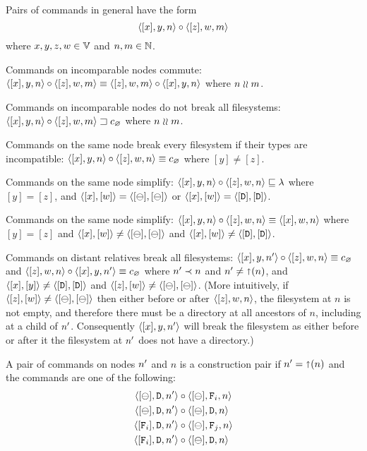 
\bigskip

\noindent
Pairs of commands in general have the form
\[ \cxynv\cc  \czwmv \]
where $x,y,z,w\in\setv$ and $n,m\in\setn$. 

\begin{myax}
Commands on incomparable nodes commute:
$\cxynv\cc\czwmv \equiv \czwmv\cc\cxynv$ where $n\unrel m$.
\end{myax}

\begin{myax}
Commands on incomparable nodes do not break all filesystems:
$\wrksx{\cxynv\cc\czwmv}$ where $n\unrel m$.
\end{myax}

\begin{myax}
Commands on the same node break every filesystem if their types are incompatible:
$\cxynv\cc\czwnv \equiv \cbrk$ where $[y]\ne [z]$.
\end{myax}

\begin{myax}
Commands on the same node simplify:
$\cxynv\cc\czwnv \eqext \emptyseq$ where $[y]=[z]$, and $\cxw=\cbb$ 
or $\cxw=\cdd$.
\end{myax}

\begin{myax}
Commands on the same node simplify:
$\cxynv\cc \czwnv \equiv \cxwnv$ where $[y]=[z]$ and $\cxw\neq\cbb$ and $\cxw\neq\cdd$.
\end{myax}

\begin{myax}
Commands on distant relatives break all filesystems:
$\cxynnv\cc\czwnv \equiv \cbrk$
and $\czwnv\cc\cxynnv \equiv\cbrk$
where $\nn\descendant n$ and $\nn\neq\parent(n)$, and $\cxy\neq\cdd$ and $\czw\neq\cbb$.
(More intuitively, if $\czw\neq\cbb$ then either before or after $\czwnv$, the filesystem at
$n$ is not empty, and therefore there must be a directory at all ancestors of $n$, including at a child of $\nn$.
Consequently $\cxynnv$ will break the filesystem as either before or after it the filesystem at $\nn$
does not have a directory.)
\end{myax}

\begin{mydef}
A pair of commands on nodes $\nn$ and $n$ is a construction pair if $\nn=\parent(n)$ 
and the commands are one
of the following:
   \begin{align*}
            \cbdaa{\nn}&\cc  \cbfaa{n} \\
            \cbdaa{\nn}&\cc  \cbdaa{n} \\
            \cfdaa{\nn}&\cc  \caaa{\empt}{\valff}{n} \\
            \cfdaa{\nn}&\cc  \cbdaa{n}
   \end{align*}
\end{mydef}



